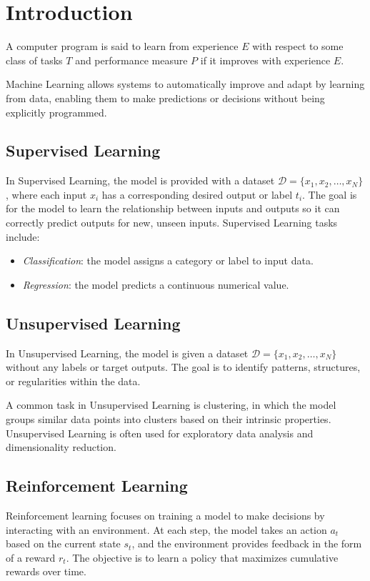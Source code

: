\section{Introduction}

\begin{definition}
    A computer program is said to learn from experience $E$ with respect to some class of tasks $T$ and performance measure $P$ if it improves with experience $E$. 
\end{definition}
\noindent Machine Learning allows systems to automatically improve and adapt by learning from data, enabling them to make predictions or decisions without being explicitly programmed.

\subsection{Supervised Learning}
In Supervised Learning, the model is provided with a dataset $\mathcal{D} = \{x_1, x_2, \dots, x_N\}$, where each input $x_i$ has a corresponding desired output or label $t_i$. 
The goal is for the model to learn the relationship between inputs and outputs so it can correctly predict outputs for new, unseen inputs.
Supervised Learning tasks include:
\begin{itemize} 
    \item \textit{Classification}: the model assigns a category or label to input data.
    \item \textit{Regression}: the model predicts a continuous numerical value. 
\end{itemize} 

\subsection{Unsupervised Learning}
In Unsupervised Learning, the model is given a dataset $\mathcal{D} = \{x_1, x_2, \dots, x_N\}$ without any labels or target outputs.
The goal is to identify patterns, structures, or regularities within the data.

A common task in Unsupervised Learning is clustering, in which the model groups similar data points into clusters based on their intrinsic properties.
Unsupervised Learning is often used for exploratory data analysis and dimensionality reduction.

\subsection{Reinforcement Learning}
Reinforcement learning focuses on training a model to make decisions by interacting with an environment.
At each step, the model takes an action $a_t$ based on the current state $s_t$, and the environment provides feedback in the form of a reward $r_t$. 
The objective is to learn a policy that maximizes cumulative rewards over time.